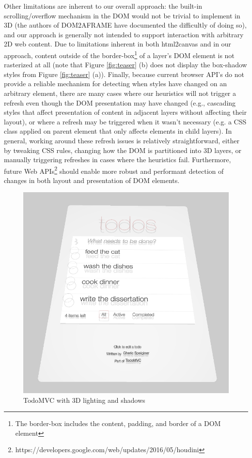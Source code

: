 \documentclass[sigconf]{acmart}
\begin{document}
Other limitations are inherent to our overall approach: the built-in scrolling/overflow mechanism in the DOM would not be trivial to implement in 3D (the authors of DOM2AFRAME have documented the difficultly of doing so), and our approach is generally not intended to support interaction with arbitrary 2D web content. Due to limitations inherent in both html2canvas and in our approach, content outside of the border-box\footnote{The border-box includes the content, padding, and border of a DOM element} of a layer's DOM element is not rasterized at all (note that Figure \ref{fig:teaser} (b) does not display the box-shadow styles from Figure \ref{fig:teaser} (a)). Finally, because current browser API's do not provide a reliable mechanism for detecting when styles have changed on an arbitrary element, there are many cases where our heuristics will not trigger a refresh even though the DOM presentation may have changed (e.g., cascading styles that affect presentation of content in adjacent layers without affecting their layout), or where a refresh may be triggered when it wasn't necessary (e.g. a CSS class applied on parent element that only affects elements in child layers). In general, working around these refresh issues is relatively straightforward, either by tweaking CSS rules, changing how the DOM is partitioned into 3D layers, or manually triggering refreshes in cases where the heuristics fail. Furthermore, future Web APIs\footnote{https://developers.google.com/web/updates/2016/05/houdini} should enable more robust and performant detection of changes in both layout and presentation of DOM elements. 

\begin{figure}[h]
  \centering
  \includegraphics[width=\linewidth]{TodoMVC-Shadows-2.png}
  \caption{TodoMVC with 3D lighting and shadows}
  \Description{}
  \label{fig:todo-shadows}
\end{figure}
\end{document}
